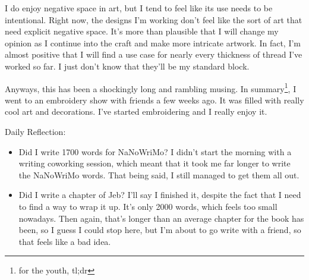\documentclass[12pt]{article}[titlepage]
\newcommand{\1}{\={a}}
\newcommand{\2}{\={e}}
\newcommand{\3}{\={\i}}
\newcommand{\4}{\=o}
\newcommand{\5}{\=u}
\newcommand{\6}{\={A}}
\renewcommand{\,}{\textsuperscript{,}}
\begin{document}
I do enjoy negative space in art, but I tend to feel like its use needs to be intentional.
Right now, the designs I'm working don't feel like the sort of art that need explicit negative space.
It's more than plausible that I will change my opinion as I continue into the craft and make more intricate artwork.
In fact, I'm almost positive that I will find a use case for nearly every thickness of thread I've worked so far.
I just don't know that they'll be my standard block.

Anyways, this has been a shockingly long and rambling musing.
In summary\footnote{for the youth, tl;dr}, I went to an embroidery show with friends a few weeks ago.
It was filled with really cool art and decorations.
I've started embroidering and I really enjoy it.

Daily Reflection:
\begin{itemize}
\item Did I write 1700 words for NaNoWriMo? I didn't start the morning with a writing coworking session, which meant that it took me far longer to write the NaNoWriMo words.
That being said, I still managed to get them all out.
\item Did I write a chapter of Jeb? I'll say I finished it, despite the fact that I need to find a way to wrap it up. It's only 2000 words, which feels too small nowadays.
Then again, that's longer than an average chapter for the book has been, so I guess I could stop here, but I'm about to go write with a friend, so that feels like a bad idea.


\end{itemize}
\end{document}
